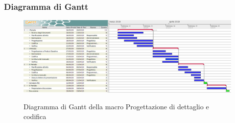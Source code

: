         \begin{landscape}
			\subsubsection{Diagramma di Gantt}        
			\begin{figure}[H]
					\centering
					\includegraphics[scale=0.44]{img/Progettazione_di_dettaglio_e_codifica.png}\\
					\caption{Diagramma di Gantt della macro Progettazione di dettaglio e codifica}
			\end{figure}
		\end{landscape}
		\newpage

